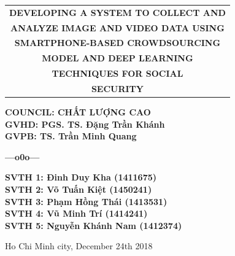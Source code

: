\begin{titlepage}
\begin{center}
\Large
	\begin{tabular}{@{}c}
		\bfseries{DEVELOPING A SYSTEM TO COLLECT AND}\\ 
		\bfseries{ANALYZE IMAGE AND VIDEO DATA USING } \\		
		\bfseries{SMARTPHONE-BASED CROWDSOURCING} \\
		\bfseries{MODEL AND DEEP LEARNING} \\
		\bfseries{TECHNIQUES FOR SOCIAL} \\
		\bfseries{SECURITY}\\
	\end{tabular}
\end{center}
	
\hspace{4.5cm}	
\begin{minipage}[t]{0.7\linewidth}
\large
	\textbf{COUNCIL: CHẤT LƯỢNG CAO}\\ [0.5cm]
	\textbf{GVHD: PGS. TS. Đặng Trần Khánh}\\ [0.5cm]
	\textbf{GVPB: TS. Trần Minh Quang}\\ [0.5cm]
	\vspace{-0.7cm}
	\begin{center}
	\textbf{---o0o---}
	\end{center}
	\textbf{SVTH 1: Đinh Duy Kha (1411675)}\\ [0.5cm]
	\textbf{SVTH 2: Võ Tuấn Kiệt (1450241)}\\[0.5cm]
	\textbf{SVTH 3: Phạm Hồng Thái (1413531)}\\[0.5cm]
	\textbf{SVTH 4: Vũ Minh Trí (1414241)}\\[0.5cm]
	\textbf{SVTH 5: Nguyễn Khánh Nam (1412374)}\\[0.5cm]
\end{minipage}

\vfill
\centerline{\large{Ho Chi Minh city, December 24th 2018}}
\end{titlepage}